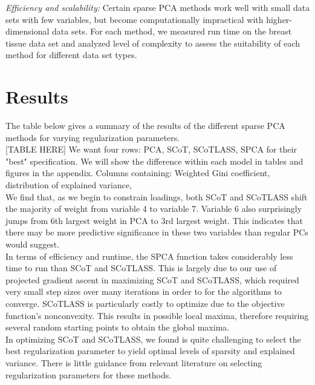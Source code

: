 \documentclass[11pt,letterpaper]{report}
\begin{document}
\textit{Efficiency and scalability:} Certain sparse PCA methods work well with small data sets with few variables, but become computationally impractical with higher-dimensional data sets. For each method, we measured run time on the breast tissue data set and analyzed level of complexity to assess the suitability of each method for different data set types.\\


\section*{Results}

The table below gives a summary of the results of the different sparse PCA methods for varying regularization parameters.\\

{\color{red}[TABLE HERE]
We want four rows: PCA, SCoT, SCoTLASS, SPCA for their "best" specification. We will show the difference within each model in tables and figures in the appendix. Columns containing: Weighted Gini coefficient, distribution of explained variance, }
\\

We find that, as we begin to constrain loadings, both SCoT and SCoTLASS shift the majority of weight from variable 4 to variable 7. Variable 6 also surprisingly jumps from 6th largest weight in PCA to 3rd largest weight. This indicates that there may be more predictive significance in these two variables than regular PCs would suggest. \\

In terms of efficiency and runtime, the SPCA function takes considerably less time to run than SCoT and SCoTLASS. This is largely due to our use of projected gradient ascent in maximizing SCoT and SCoTLASS, which required very small step sizes over many iterations in order to for the algorithms to converge. SCoTLASS is particularly costly to optimize due to the objective function's nonconvexity. This results in possible local maxima, therefore requiring several random starting points to obtain the global maxima. \\

In optimizing SCoT and SCoTLASS, we found is quite challenging to select the best regularization parameter to yield optimal levels of sparsity and explained variance. There is little guidance from relevant literature on selecting regularization parameters for these methods.\\
\end{document}
